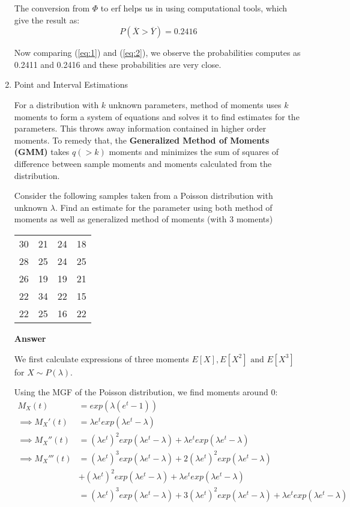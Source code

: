\documentclass[12pt, oneside]{article}
\begin{document}
\begin{enumerate}
{  The conversion from \(\Phi\) to erf helps us in using computational tools, which give the result as:
  \begin{equation}
    P(\overline{X} > \overline{Y}) = 0.2416 \label{eq:2}
  \end{equation}

  Now comparing (\ref{eq:1}) and (\ref{eq:2}), we observe the probabilities computes as 0.2411
  and 0.2416 and these probabilities are very close.
}


\item	{
  Point and Interval Estimations

  For a distribution with \(k\) unknown parameters, method of moments uses \(k\) moments
  to form a system of equations and solves it to find estimates for the parameters.
  This throws away information contained in higher order moments. To remedy that, the
  \textbf{Generalized Method of Moments (GMM)} takes \(q (> k)\) moments and minimizes
  the sum of squares of difference between sample moments and moments calculated from
  the distribution.

  Consider the following samples taken from a Poisson distribution with unknown \(\lambda\).
  Find an estimate for the parameter using both method of moments as well as generalized
  method of moments (with 3 moments)

  \begin{center}
  \begin{tabular}{cccc}
    \toprule
    30 & 21 & 24 & 18 \\
    28 & 25 & 24 & 25 \\
    26 & 19 & 19 & 21 \\
    22 & 34 & 22 & 15 \\
    22 & 25 & 16 & 22 \\
    \bottomrule
  \end{tabular}
  \end{center}

  \textbf{Answer}

  We first calculate expressions of three moments \(E[X], E[X^2] \text{ and } E[X^3]\) for
  \(X \sim P(\lambda)\).

  Using the MGF of the Poisson distribution, we find moments around 0:
  \begin{align*}
    M_X(t) &= exp(\lambda(e^t - 1)) \\
    \implies M_X'(t) &= \lambda e^t exp(\lambda e^t - \lambda) \\
    \implies M_X''(t) &= (\lambda e^t)^2 exp(\lambda e^t - \lambda) + \lambda e^t exp(\lambda e^t - \lambda) \\
    \implies M_X'''(t) &= (\lambda e^t)^3 exp(\lambda e^t - \lambda) + 2 (\lambda e^t)^2 exp(\lambda e^t - \lambda) \\
        &+ (\lambda e^t)^2 exp(\lambda e^t - \lambda) + \lambda e^t exp(\lambda e^t - \lambda) \\
        &= (\lambda e^t)^3 exp(\lambda e^t - \lambda) + 3 (\lambda e^t)^2 exp(\lambda e^t - \lambda) + \lambda e^t exp(\lambda e^t - \lambda) \\
  \end{align*}

}
\end{enumerate}
\end{document}
